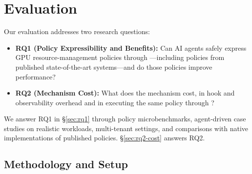 \section{Evaluation}
\label{sec:eval}

Our evaluation addresses two research questions:

\begin{itemize}[leftmargin=*]
  \item \textbf{RQ1 (Policy Expressibility and Benefits):} Can AI agents safely express GPU resource-management policies through \sys---including policies from published state-of-the-art systems---and do those policies improve performance?
  \item \textbf{RQ2 (Mechanism Cost):} What does the \sys{} mechanism cost, in hook and observability overhead and in executing the same policy through \sys{}?
\end{itemize}

We answer RQ1 in \S\ref{sec:rq1} through policy microbenchmarks, agent-driven case studies on realistic workloads, multi-tenant settings, and comparisons with native implementations of published policies. \S\ref{sec:rq2-cost} answers RQ2.

\subsection{Methodology and Setup}

